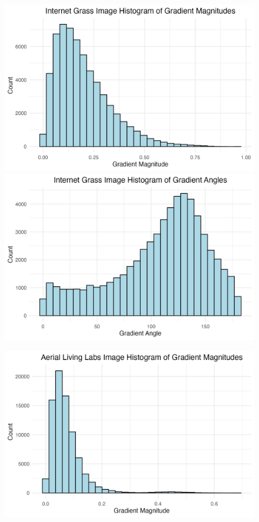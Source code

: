\documentclass[
  letterpaper,
  DIV=11,
  numbers=noendperiod]{scrreprt}
\begin{document}
\begin{figure}

\begin{minipage}{0.33\linewidth}
\includegraphics{images/plots/grass/internet_grass_histogram_mag_plot.jpg}
\includegraphics{images/plots/grass/internet_grass_histogram_theta_plot.jpg}\end{minipage}%
%
\begin{minipage}{0.33\linewidth}
\includegraphics{images/plots/grass/aerial_living_lab_histogram_mag_plot.jpg}

\end{minipage}
\end{figure}
\end{document}
